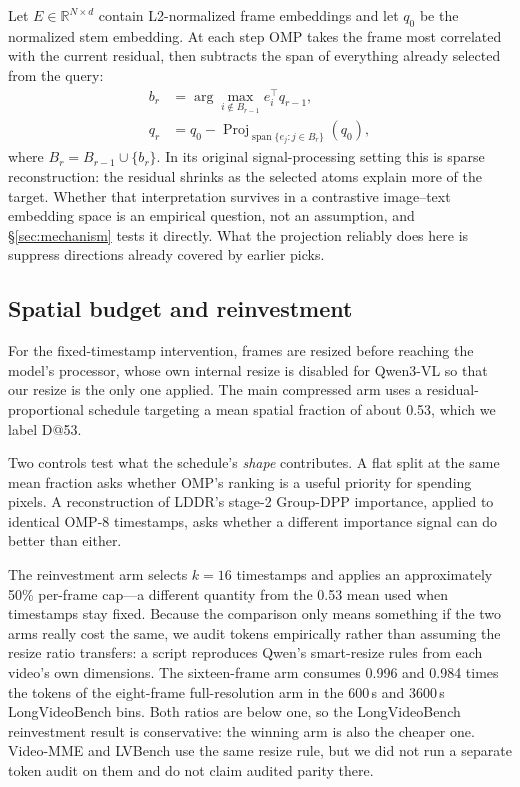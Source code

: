 \documentclass[11pt]{article}
\begin{document}
Let $E\in\mathbb{R}^{N\times d}$ contain L2-normalized frame embeddings and let $q_0$ be the normalized stem embedding.
At each step OMP takes the frame most correlated with the current residual, then subtracts the span of everything already selected from the query:
\begin{equation}
\begin{aligned}
b_r &= \arg\max_{i\notin B_{r-1}} e_i^\top q_{r-1},\\
q_r &= q_0-\operatorname{Proj}_{\operatorname{span}\{e_j:j\in B_r\}}(q_0),
\end{aligned}
\label{eq:omp}
\end{equation}
where $B_r=B_{r-1}\cup\{b_r\}$.
In its original signal-processing setting this is sparse reconstruction: the residual shrinks as the selected atoms explain more of the target.
Whether that interpretation survives in a contrastive image--text embedding space is an empirical question, not an assumption, and \S\ref{sec:mechanism} tests it directly.
What the projection reliably does here is suppress directions already covered by earlier picks.

\subsection{Spatial budget and reinvestment}

For the fixed-timestamp intervention, frames are resized before reaching the model's processor, whose own internal resize is disabled for Qwen3-VL so that our resize is the only one applied.
The main compressed arm uses a residual-proportional schedule targeting a mean spatial fraction of about 0.53, which we label D@53.

Two controls test what the schedule's \emph{shape} contributes.
A flat split at the same mean fraction asks whether OMP's ranking is a useful priority for spending pixels.
A reconstruction of LDDR's stage-2 Group-DPP importance, applied to identical OMP-8 timestamps, asks whether a different importance signal can do better than either.

The reinvestment arm selects $k{=}16$ timestamps and applies an approximately 50\% per-frame cap---a different quantity from the 0.53 mean used when timestamps stay fixed.
Because the comparison only means something if the two arms really cost the same, we audit tokens empirically rather than assuming the resize ratio transfers: a script reproduces Qwen's smart-resize rules from each video's own dimensions.
The sixteen-frame arm consumes 0.996 and 0.984 times the tokens of the eight-frame full-resolution arm in the 600\,s and 3600\,s LongVideoBench bins.
Both ratios are below one, so the LongVideoBench reinvestment result is conservative: the winning arm is also the cheaper one.
Video-MME and LVBench use the same resize rule, but we did not run a separate token audit on them and do not claim audited parity there.
\end{document}
